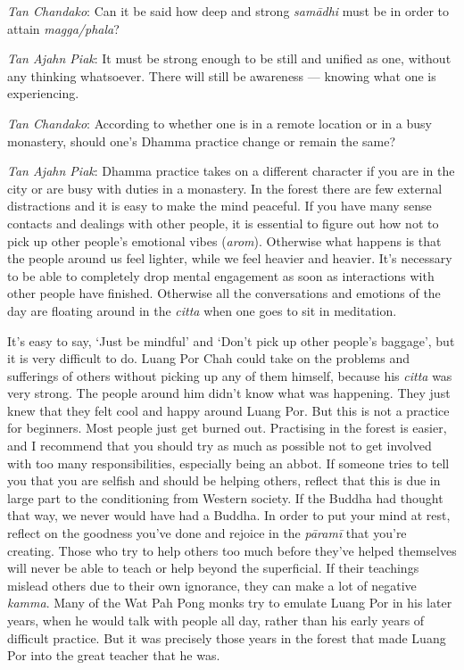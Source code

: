 \emph{Tan Chandako}: Can it be said how deep and strong \emph{samādhi}
must be in order to attain \emph{magga/phala}?

\emph{Tan Ajahn Piak}: It must be strong enough to be still and unified
as one, without any thinking whatsoever. There will still be awareness
--- knowing what one is experiencing.

\emph{Tan Chandako}: According to whether one is in a remote location or
in a busy monastery, should one's Dhamma practice change or remain the
same?

\emph{Tan Ajahn Piak}: Dhamma practice takes on a different character if
you are in the city or are busy with duties in a monastery. In the
forest there are few external distractions and it is easy to make the
mind peaceful. If you have many sense contacts and dealings with other
people, it is essential to figure out how not to pick up other people's
emotional vibes (\emph{arom}). Otherwise what happens is that the people
around us feel lighter, while we feel heavier and heavier. It's
necessary to be able to completely drop mental engagement as soon as
interactions with other people have finished. Otherwise all the
conversations and emotions of the day are floating around in the
\emph{citta} when one goes to sit in meditation.

It's easy to say, `Just be mindful' and `Don't pick up other people's
baggage', but it is very difficult to do. Luang Por Chah could take on
the problems and sufferings of others without picking up any of them
himself, because his \emph{citta} was very strong. The people around him
didn't know what was happening. They just knew that they felt cool and
happy around Luang Por. But this is not a practice for beginners. Most
people just get burned out. Practising in the forest is easier, and I
recommend that you should try as much as possible not to get involved
with too many responsibilities, especially being an abbot. If someone
tries to tell you that you are selfish and should be helping others,
reflect that this is due in large part to the conditioning from Western
society. If the Buddha had thought that way, we never would have had a
Buddha. In order to put your mind at rest, reflect on the goodness
you've done and rejoice in the \emph{pāramī} that you're creating. Those
who try to help others too much before they've helped themselves will
never be able to teach or help beyond the superficial. If their
teachings mislead others due to their own ignorance, they can make a lot
of negative \emph{kamma}. Many of the Wat Pah Pong monks try to emulate
Luang Por in his later years, when he would talk with people all day,
rather than his early years of difficult practice. But it was precisely
those years in the forest that made Luang Por into the great teacher
that he was.

